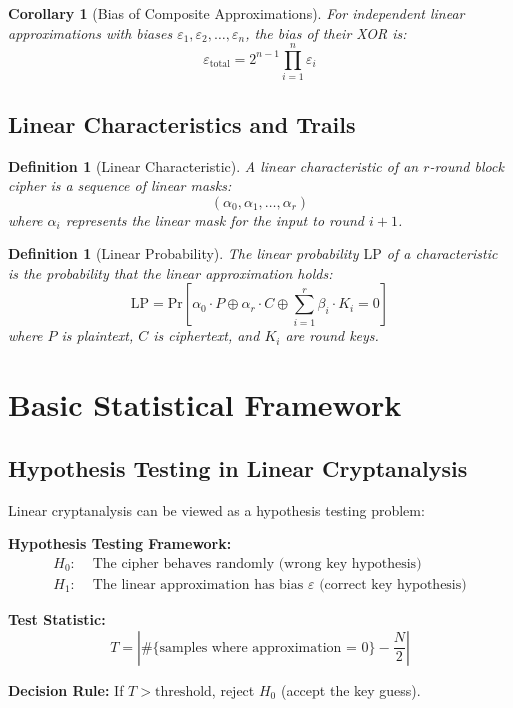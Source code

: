\documentclass[12pt,a4paper]{article}
\newtheorem{definition}[theorem]{Definition}
\newtheorem{corollary}[theorem]{Corollary}
\newcommand{\bias}{\varepsilon}
\newcommand{\prob}[1]{\text{Pr}[#1]}
\newcommand{\xor}{\oplus}
\newcommand{\LP}{\text{LP}}
\begin{document}
\begin{corollary}[Bias of Composite Approximations]
For independent linear approximations with biases $\bias_1, \bias_2, \ldots, \bias_n$, the bias of their XOR is:
$$\bias_{\text{total}} = 2^{n-1} \prod_{i=1}^n \bias_i$$
\end{corollary}

\subsection{Linear Characteristics and Trails}

\begin{definition}[Linear Characteristic]
A linear characteristic of an $r$-round block cipher is a sequence of linear masks:
$$(\alpha_0, \alpha_1, \ldots, \alpha_r)$$
where $\alpha_i$ represents the linear mask for the input to round $i+1$.
\end{definition}

\begin{definition}[Linear Probability]
The linear probability $\LP$ of a characteristic is the probability that the linear approximation holds:
$$\LP = \prob{\alpha_0 \cdot P \xor \alpha_r \cdot C \xor \sum_{i=1}^r \beta_i \cdot K_i = 0}$$
where $P$ is plaintext, $C$ is ciphertext, and $K_i$ are round keys.
\end{definition}

\section{Basic Statistical Framework}

\subsection{Hypothesis Testing in Linear Cryptanalysis}

Linear cryptanalysis can be viewed as a hypothesis testing problem:

\begin{mathematicsbox}
\textbf{Hypothesis Testing Framework:}
\begin{align}
H_0: & \text{ The cipher behaves randomly (wrong key hypothesis)} \\
H_1: & \text{ The linear approximation has bias } \bias \text{ (correct key hypothesis)}
\end{align}

\textbf{Test Statistic:}
$$T = \left| \# \{\text{samples where approximation = 0}\} - \frac{N}{2} \right|$$

\textbf{Decision Rule:}
If $T > \text{threshold}$, reject $H_0$ (accept the key guess).
\end{mathematicsbox}
\end{document}

